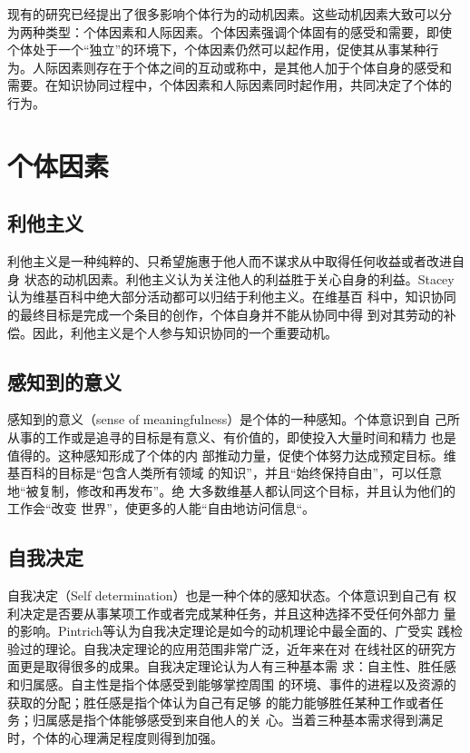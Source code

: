 现有的研究已经提出了很多影响个体行为的动机因素。这些动机因素大致可以分
为两种类型：个体因素和人际因素。个体因素强调个体固有的感受和需要，即使
个体处于一个“独立”的环境下，个体因素仍然可以起作用，促使其从事某种行
为。人际因素则存在于个体之间的互动或称中，是其他人加于个体自身的感受和
需要。在知识协同过程中，个体因素和人际因素同时起作用，共同决定了个体的
行为。

\section{个体因素}
\label{sec:individual-factor}

\subsection{利他主义}
\label{sec:altruism}

利他主义是一种纯粹的、只希望施惠于他人而不谋求从中取得任何收益或者改进自身
状态的动机因素。利他主义认为关注他人的利益胜于关心自身的利益。Stacey认为维基百科中绝大部分活动都可以归结于利他主义。在维基百
科中，知识协同的最终目标是完成一个条目的创作，个体自身并不能从协同中得
到对其劳动的补偿。因此，利他主义是个人参与知识协同的一个重要动机。

\subsection{感知到的意义}
\label{sec:sense-of-meaning}

感知到的意义（sense of meaningfulness）是个体的一种感知。个体意识到自
己所从事的工作或是追寻的目标是有意义、有价值的，即使投入大量时间和精力
也是值得的。这种感知形成了个体的内
部推动力量，促使个体努力达成预定目标。维基百科的目标是“包含人类所有领域
的知识”，并且“始终保持自由”，可以任意地“被复制，修改和再发布”。绝
大多数维基人都认同这个目标，并且认为他们的工作会“改变
世界”，使更多的人能“自由地访问信息“。

\subsection{自我决定}
\label{sec:self-determination}

自我决定（Self determination）也是一种个体的感知状态。个体意识到自己有
权利决定是否要从事某项工作或者完成某种任务，并且这种选择不受任何外部力
量的影响。Pintrich等认为自我决定理论是如今的动机理论中最全面的、广受实
践检验过的理论。自我决定理论的应用范围非常广泛，近年来在对
在线社区的研究方面更是取得很多的成果。自我决定理论认为人有三种基本需
求：自主性、胜任感和归属感。自主性是指个体感受到能够掌控周围
的环境、事件的进程以及资源的获取的分配；胜任感是指个体认为自己有足够
的能力能够胜任某种工作或者任务；归属感是指个体能够感受到来自他人的关
心。当着三种基本需求得到满足时，个体的心理满足程度则得到加强。

